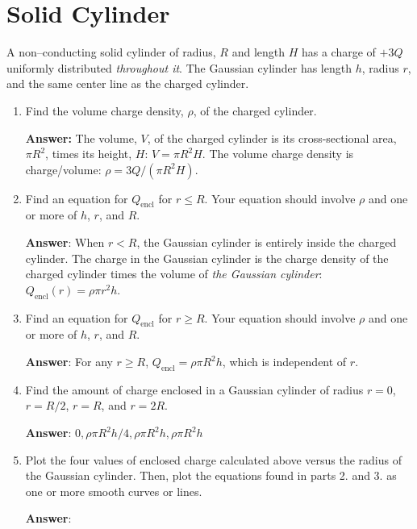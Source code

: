 \documentclass{article}
\begin{document}
\newpage

\section{Solid Cylinder}

A non--conducting solid cylinder of radius, $R$ and length $H$ has a charge of $+3Q$ uniformly distributed \emph{throughout it}. The Gaussian cylinder has length $h$, radius $r$, and the same center line as the charged cylinder.



\begin{enumerate}

  \item Find the volume charge density, $\rho$, of the charged cylinder.

        \ifsolutions
        {\bf Answer:} The volume, $V$, of the charged cylinder is its cross-sectional area, $\pi R^2$, times its height, $H$: $V=\pi R^2 H$. The volume charge density is charge/volume: $\rho=3Q/(\pi R^2 H)$.
        \fi

        \ifsolutions\else
        \vskip 36pt
        \fi

  \item Find an equation for $Q_{\text{encl}}$ for $r\le R$. Your equation should involve $\rho$ and one or more of $h$, $r$, and $R$.

        \ifsolutions
        {\bf Answer}: When $r<R$, the Gaussian cylinder is entirely inside the charged cylinder. The charge in the Gaussian cylinder is the charge density of the charged cylinder times the volume of \emph{the Gaussian cylinder}: $Q_{\text{encl}}(r)=\rho \pi r^2 h$.
        \fi

        \ifsolutions\else
        \vskip 36pt
        \fi

  \item Find an equation for $Q_{\text{encl}}$ for $r\ge R$. Your equation should involve $\rho$ and one or more of $h$, $r$, and $R$.

        \ifsolutions
        {\bf Answer}: For any $r\ge R$, $Q_{\text{encl}}=\rho \pi R^2 h$, which is independent of $r$. 
        \fi

        \ifsolutions\else
        \vskip 36pt
        \fi

  \item Find the amount of charge enclosed in a Gaussian cylinder of radius $r=0$, $r=R/2$, $r=R$, and $r=2R$.

        \ifsolutions
        {\bf Answer}:  $0, \rho\pi R^2 h/4, \rho \pi R^2 h, \rho \pi R^2 h$
        \fi

        \ifsolutions\else
        \vskip 36pt
        \fi

  \item Plot the four values of enclosed charge calculated above versus the radius of the Gaussian cylinder. Then, plot the equations found in parts 2. and 3. as one or more smooth curves or lines.

        \ifsolutions
        {\bf Answer}:

        
        \fi

\end{enumerate}
\end{document}
